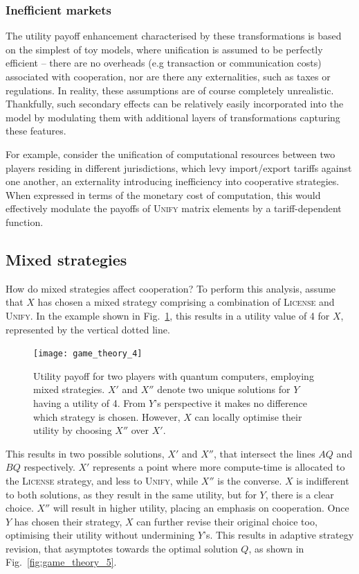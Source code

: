 \subsubsection{Inefficient markets}

The utility payoff enhancement characterised by these transformations is based on the simplest of toy models, where unification is assumed to be perfectly efficient -- there are no overheads (e.g transaction or communication costs) associated with cooperation, nor are there any externalities, such as taxes or regulations. In reality, these assumptions are of course completely unrealistic. Thankfully, such secondary effects can be relatively easily incorporated into the model by modulating them with additional layers of transformations capturing these features.

For example, consider the unification of computational resources between two players residing in different jurisdictions, which levy import/export tariffs against one another, an externality introducing inefficiency into cooperative strategies. When expressed in terms of the monetary cost of computation, this would effectively modulate the payoffs of \textsc{Unify} matrix elements by a tariff-dependent function.

\subsection{Mixed strategies}

How do mixed strategies affect cooperation? To perform this analysis, assume that $X$ has chosen a mixed strategy comprising a combination of \textsc{License} and \textsc{Unify}. In the example shown in Fig.~\ref{fig:game_theory_4}, this results in a utility value of 4 for $X$, represented by the vertical dotted line.

\begin{figure}[!htbp]
\texttt{[image: game\_theory\_4]}
\captionspacefig \caption{Utility payoff for two players with quantum computers, employing mixed strategies. $X'$ and $X''$ denote two unique solutions for $Y$ having a utility of 4. From $Y$'s perspective it makes no difference which strategy is chosen. However, $X$ can locally optimise their utility by choosing $X''$ over $X'$.}\label{fig:game_theory_4}
\end{figure}

This results in two possible solutions, $X'$ and $X''$, that intersect the lines $AQ$ and $BQ$ respectively. $X'$ represents a point where more compute-time is allocated to the \textsc{License} strategy, and less to \textsc{Unify}, while $X''$ is the converse. $X$ is indifferent to both solutions, as they result in the same utility, but for $Y$, there is a clear choice. $X''$ will result in higher utility, placing an emphasis on cooperation. Once $Y$ has chosen their strategy, $X$ can further revise their original choice too, optimising their utility without undermining $Y$'s. This results in adaptive strategy revision, that asymptotes towards the optimal solution $Q$, as shown in Fig.~\ref{fig:game_theory_5}.

